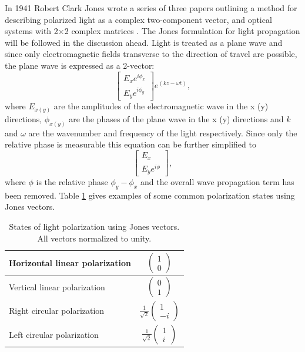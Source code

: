 In 1941 Robert Clark Jones wrote a series of three papers outlining a method for describing polarized light as a complex two-component vector, and optical systems with 2$\times$2 complex matrices \cite{Jones1}\cite{Jones2}\cite{Jones3}. The Jones formulation for light propagation will be followed in the discussion ahead. Light is treated as a plane wave and since only electromagnetic fields transverse to the direction of travel are possible, the plane wave is expressed as a 2-vector:
\begin{equation}
\left[\begin{array}{c}E_xe^{i\phi_x}\\E_ye^{i\phi_y}\end{array}\right]e^{(kz-\omega t)},
\label{eq:jones_vector}
\end{equation}
where $E_{x(y)}$ are the amplitudes of the electromagnetic wave in the x (y) directions, $\phi_{x(y)}$ are the phases of the plane wave in the x (y) directions and $k$ and $\omega$ are the wavenumber and frequency of the light respectively. Since only the relative phase is measurable this equation can be further simplified to
\begin{equation}
\left[\begin{array}{c}E_x\\E_ye^{i\phi}\end{array}\right],
\label{eq:jones_vector_simple}
\end{equation}
where $\phi$ is the relative phase $\phi_y-\phi_x$ and the overall wave propagation term has been removed. Table \ref{tab:jones_vectors} gives examples of some common polarization states using Jones vectors. 
\begin{table}
\caption{\label{tab:jones_vectors}States of light polarization using Jones vectors. All vectors normalized to unity.}
\begin{center}
\begin{tabular}{|l|c|}\hline
Horizontal linear polarization&$\left(\begin{array}{c}1\\0\end{array}\right)$\\\hline
Vertical linear polarization&$\left(\begin{array}{c}0\\1\end{array}\right)$\\\hline
Right circular polarization&$\frac{1}{\sqrt{2}}\left(\begin{array}{c}1\\-i\end{array}\right)$\\\hline
Left circular polarization&$\frac{1}{\sqrt{2}}\left(\begin{array}{c}1\\i\end{array}\right)$\\\hline
\end{tabular}
\end{center}
\end{table}
